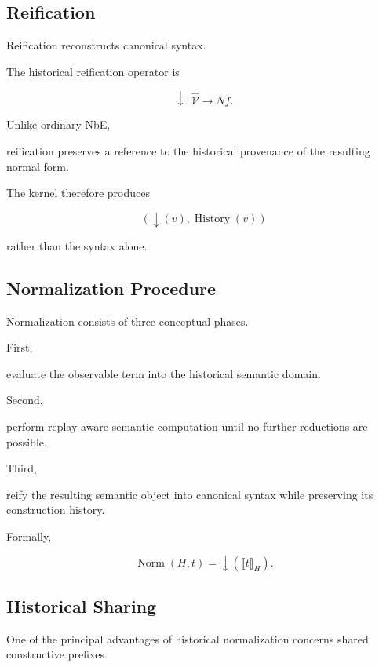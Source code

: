 \documentclass[12pt,oneside]{article}
\theoremstyle{definition}
\theoremstyle{remark}
\DeclareMathOperator{\History}{History}
\begin{document}

\subsection{Reification}

Reification reconstructs canonical syntax.

The historical reification operator is

\[
\downarrow
:
\widehat{\mathcal V}
\rightarrow
Nf.
\]

Unlike ordinary NbE,

reification preserves a reference to the historical provenance of the resulting
normal form.

The kernel therefore produces

\[
(
\downarrow(v),
\History(v)
)
\]

rather than the syntax alone.


\subsection{Normalization Procedure}

Normalization consists of three conceptual phases.

First,

evaluate the observable term into the historical semantic domain.

Second,

perform replay-aware semantic computation until no further reductions are
possible.

Third,

reify the resulting semantic object into canonical syntax while preserving its
construction history.

Formally,

\[
\operatorname{Norm}(H,t)
=
\downarrow
(
\llbracket
t
\rrbracket_H
).
\]


\subsection{Historical Sharing}

One of the principal advantages of historical normalization concerns shared
constructive prefixes.
\end{document}
